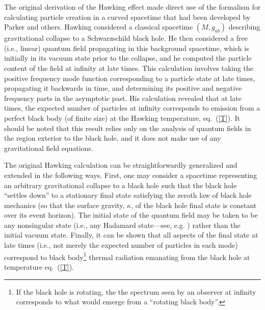\documentclass[12pt]{article}
\begin{document}
The original derivation of the Hawking effect \cite{h2} made direct
use of the formalism for calculating particle creation in a curved
spacetime that had been developed by Parker \cite{par} and
others. Hawking considered a classical spacetime $(M, g_{ab})$
describing gravitational collapse to a Schwarzschild black hole. He
then considered a free (i.e., linear) quantum field propagating in
this background spacetime, which is initially in its vacuum state
prior to the collapse, and he computed the particle content of the
field at infinity at late times. This calculation involves taking the
positive frequency mode function corresponding to a particle state at
late times, propagating it backwards in time, and determining its
positive and negative frequency parts in the asymptotic past. His
calculation revealed that at late times, the expected number of
particles at infinity corresponds to emission from a perfect black
body (of finite size) at the Hawking temperature, eq.~(\ref{T}). It
should be noted that this result relies only on the analysis of
quantum fields in the region exterior to the black hole, and it does
not make use of any gravitational field equations.

The original Hawking calculation can be straightforwardly generalized
and extended in the following ways. First, one may consider a
spacetime representing an arbitrary gravitational collapse to a black
hole such that the black hole ``settles down'' to a stationary final
state satisfying the zeroth law of black hole mechanics (so that the
surface gravity, $\kappa$, of the black hole final state is constant
over its event horizon). The initial state of the quantum field may be
taken to be any nonsingular state (i.e., any Hadamard state---see,
e.g. \cite{w4}) rather than the initial vacuum state. Finally, it can
be shown \cite{w7} that all aspects of the final state at late times
(i.e., not merely the expected number of particles in each mode)
correspond to black body\footnote{If the black hole is rotating, the
the spectrum seen by an observer at infinity corresponds to what would
emerge from a ``rotating black body''.} thermal radiation emanating
from the black hole at temperature eq.~(\ref{T}).
\end{document}
